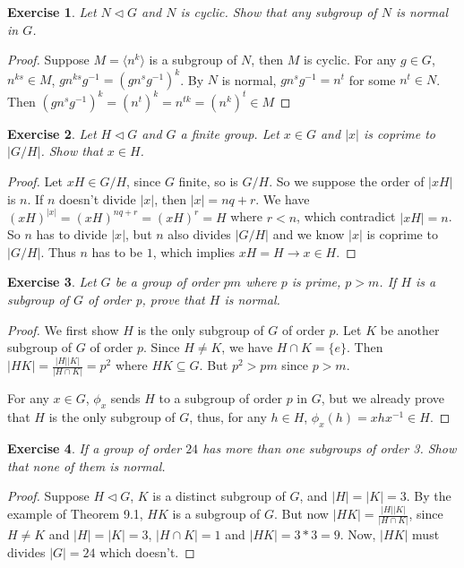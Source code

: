 \documentclass[14pt]{extarticle}
\newtheorem{exercise}{Exercise}[section]
\newcommand{\inv}[1]{#1^{-1}}
\newcommand{\normalin}{\triangleleft}
\newcommand{\1}{\{ e \}}
\begin{document}
\setcounter{exercise}{58}
\begin{exercise}
  Let $N \normalin G$ and $N$ is cyclic. Show that any subgroup of $N$ is normal in $G$.
\end{exercise}
\begin{proof}
  Suppose $M = \langle n^k \rangle$ is a subgroup of $N$, then $M$ is cyclic.
  For any $g \in G$, $n^{ks} \in M$, $g n^{ks} \inv{g} = (g n^s \inv{g})^k$.
  By $N$ is normal, $g n^s \inv{g} = n^t$ for some $n^t \in N$.
  Then $(g n^s \inv{g})^k = (n^t)^k = n^{tk} = (n^k)^t \in M$
\end{proof}

\setcounter{exercise}{60}
\begin{exercise}
  Let $H \normalin G$ and $G$ a finite group. Let $x \in G$ and $|x|$ is coprime to $|G/H|$.
  Show that $x \in H$.
\end{exercise}
\begin{proof}
  Let $xH \in G/H$, since $G$ finite, so is $G/H$. So we suppose the order of $|xH|$ is $n$.
  If $n$ doesn't divide $|x|$, then $|x| = nq + r$.
  We have $(xH)^{|x|} = (xH)^{nq + r} = (xH)^r = H$ where $r < n$, which contradict $|xH| = n$.
  So $n$ has to divide $|x|$, but $n$ also divides $|G/H|$ and we know $|x|$ is coprime to $|G/H|$.
  Thus $n$ has to be $1$, which implies $xH = H \rightarrow x \in H$.
\end{proof}

\begin{exercise}
  Let $G$ be a group of order $pm$ where $p$ is prime, $p > m$.
  If $H$ is a subgroup of $G$ of order p, prove that $H$ is normal.
\end{exercise}
\begin{proof}
  We first show $H$ is the only subgroup of $G$ of order $p$.
  Let $K$ be another subgroup of $G$ of order $p$.
  Since $H \neq K$, we have $H \cap K = \{ e \}$.
  Then $\displaystyle |HK| = \frac{|H||K|}{|H \cap K|} = p^2$ where $HK \subseteq G$.
  But $p^2 > pm$ since $p > m$.

  For any $x \in G$, $\phi_x$ sends $H$ to a subgroup of order $p$ in $G$,
  but we already prove that $H$ is the only subgroup of $G$, thus,
  for any $h \in H$, $\phi_x(h) = xh\inv{x} \in H$.
\end{proof}

\begin{exercise}
  If a group of order $24$ has more than one subgroups of order 3. 
  Show that none of them is normal.
\end{exercise}
\begin{proof}
  Suppose $H \normalin G$, $K$ is a distinct subgroup of $G$, and $|H| = |K| = 3$.
  By the example of Theorem 9.1, $HK$ is a subgroup of $G$.
  But now $\displaystyle |HK| = \frac{|H||K|}{|H \cap K|}$,
  since $H \neq K$ and $|H| = |K| = 3$, $|H \cap K| = 1$ and $|HK| = 3 * 3 = 9$.
  Now, $|HK|$ must divides $|G| = 24$ which doesn't.
\end{proof}
\end{document}
